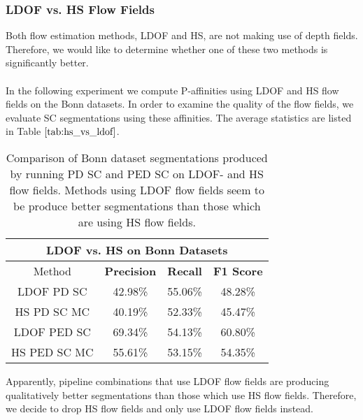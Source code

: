 \subsubsection{LDOF vs. HS Flow Fields}
Both flow estimation methods, LDOF and HS, are not making use of depth fields. Therefore, we would like to determine whether one of these two methods is significantly better. \\ \\
In the following experiment we compute P-affinities using LDOF and HS flow fields on the Bonn datasets. In order to examine the quality of the flow fields, we evaluate SC segmentations using these affinities. The average statistics are listed in Table $\ref{tab:hs_vs_ldof}$.
\begin{table}[H]
\centering
\begin{tabular}{|c|c|c|c|}
\hline
\multicolumn{4}{|c|}{LDOF vs. HS on Bonn Datasets}                        \\ \hline
Method & \textbf{Precision} & \textbf{Recall} & \textbf{F1 Score} \\ \hline
LDOF PD SC & 42.98\%   & 55.06\%     & 48.28\%  \\ \hline
HS PD SC MC & 40.19\%   & 52.33\%     & 45.47\%  \\ \hline
LDOF PED SC & 69.34\%   & 54.13\%     & 60.80\%  \\ \hline
HS PED SC MC & 55.61\%   & 53.15\%     & 54.35\%  \\ \hline             
\end{tabular}
\caption[LDOF vs. HS Flow Fields]{Comparison of Bonn dataset segmentations produced by running PD SC and PED SC on LDOF- and HS flow fields. Methods using LDOF flow fields seem to be produce better segmentations than those which are using HS flow fields.}
\label{tab:hs_vs_ldof}
\end{table}
Apparently, pipeline combinations that use LDOF flow fields are producing qualitatively better segmentations than those which use HS flow fields. Therefore, we decide to drop HS flow fields and only use LDOF flow fields instead.

